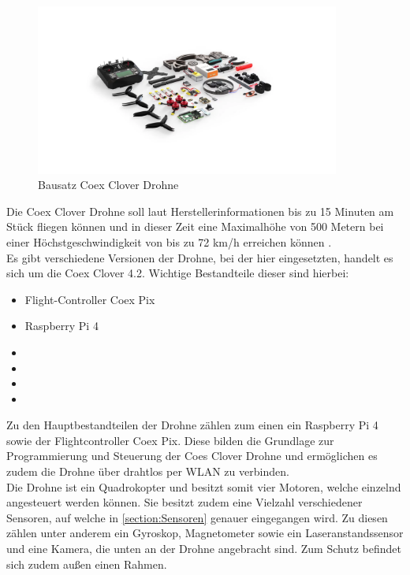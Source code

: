 \begin{figure}[htpb]
    \centering
    \includegraphics[width=10cm,keepaspectratio,angle=0]{images/coex_clover_kit.jpg}
    \caption[Bausatz Coex Clover Drohne]{\label{img coex_clover_kit} Bausatz Coex Clover Drohne \cite{img_coex_clover_kit}}
\end{figure}

Die Coex Clover Drohne soll laut Herstellerinformationen bis zu 15 Minuten am Stück fliegen können und in dieser Zeit eine Maximalhöhe von 500 Metern bei einer Höchstgeschwindigkeit von bis zu 72 km/h erreichen können \cite[vgl.][]{coex_clover}.\\

Es gibt verschiedene Versionen der Drohne, bei der hier eingesetzten, handelt es sich um die Coex Clover 4.2.
Wichtige Bestandteile dieser sind hierbei:
\begin{center}
    \begin{itemize}
        \item Flight-Controller Coex Pix
        \item Raspberry Pi 4
        \item 
        \item 
        \item 
        \item 
    \end{itemize}
    \label{lst:coex-components}
\end{center}

Zu den Hauptbestandteilen der Drohne zählen zum einen ein Raspberry Pi 4 sowie der Flightcontroller Coex Pix. Diese bilden die Grundlage zur Programmierung und Steuerung der Coes Clover Drohne und ermöglichen es zudem die Drohne über drahtlos per WLAN zu verbinden. \\
Die Drohne ist ein Quadrokopter und besitzt somit vier Motoren, welche einzelnd angesteuert werden können. Sie besitzt zudem eine Vielzahl verschiedener Sensoren, auf welche in \ref{section:Sensoren} genauer eingegangen wird. Zu diesen zählen unter anderem ein Gyroskop, Magnetometer sowie ein Laseranstandssensor und eine Kamera, die unten an der Drohne angebracht sind.
Zum Schutz befindet sich zudem außen einen Rahmen.



